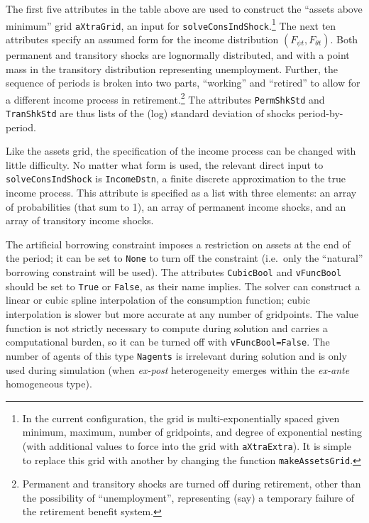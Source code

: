 \documentclass[12pt,titlepage,letterpaper]{econtex}
\begin{document}
The first five attributes in the table above are used to construct the ``assets above minimum'' grid \texttt{aXtraGrid}, an input for \texttt{solveConsIndShock}.\footnote{In the current configuration, the grid is multi-exponentially spaced given minimum, maximum, number of gridpoints, and degree of exponential nesting (with additional values to force into the grid with \texttt{aXtraExtra}).  It is simple to replace this grid with another by changing the function \texttt{makeAssetsGrid}.}  The next ten attributes specify an assumed form for the income distribution $(F_{\psi t}, F_{\theta t})$. Both permanent and transitory shocks are lognormally distributed, and with a point mass in the transitory distribution representing unemployment.  Further, the sequence of periods is broken into two parts, ``working'' and ``retired'' to allow for a different income process in retirement.\footnote{Permanent and transitory shocks are turned off during retirement, other than the possibility of ``unemployment'', representing (say) a temporary failure of the retirement benefit system.} The attributes \texttt{PermShkStd} and \texttt{TranShkStd} are thus lists of the (log) standard deviation of shocks period-by-period.

Like the assets grid, the specification of the income process can be changed with little difficulty.  No matter what form is used, the relevant direct input to \texttt{solveConsIndShock} is \texttt{IncomeDstn}, a finite discrete approximation to the true income process.  This attribute is specified as a list with three elements: an array of probabilities (that sum to 1), an array of permanent income shocks, and an array of transitory income shocks.

The artificial borrowing constraint imposes a restriction on assets at the end of the period; it can be set to \texttt{None} to turn off the constraint (i.e.\ only the ``natural'' borrowing constraint will be used). The attributes \texttt{CubicBool} and \texttt{vFuncBool} should be set to \texttt{True} or \texttt{False}, as their name implies.  The solver can construct a linear or cubic spline interpolation of the consumption function; cubic interpolation is slower but more accurate at any number of gridpoints.  The value function is not strictly necessary to compute during solution and carries a computational burden, so it can be turned off with \texttt{vFuncBool=False}.  The number of agents of this type \texttt{Nagents} is irrelevant during solution and is only used during simulation (when \textit{ex-post} heterogeneity emerges within the \textit{ex-ante} homogeneous type).
\end{document}
